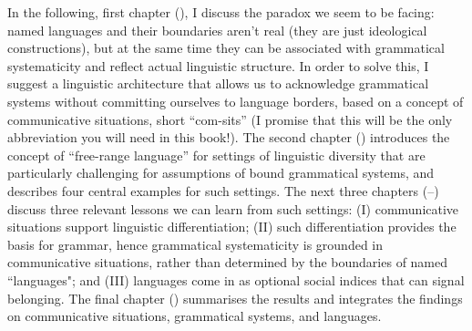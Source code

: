 In the following, first chapter (), I discuss the paradox we seem to be facing: named languages and their boundaries aren’t real (they are just ideological constructions), but at the same time they can be associated with grammatical systematicity and reflect actual linguistic structure. In order to solve this, I suggest a linguistic architecture that allows us to acknowledge grammatical systems without committing ourselves to language borders, based on a concept of communicative situations, short “com-sits” (I promise that this will be the only abbreviation you will need in this book!). The second chapter () introduces the concept of “free-range language” for settings of linguistic diversity that are particularly challenging for assumptions of bound grammatical systems, and describes four central examples for such settings. The next three chapters (--) discuss three relevant lessons we can learn from such settings:
(I) communicative situations support linguistic differentiation;
(II) such differentiation provides the basis for grammar, hence grammatical systematicity is grounded in communicative situations, rather than determined by the boundaries of named “languages"; and
(III) languages come in as optional social indices that can signal belonging. The final chapter () summarises the results and integrates the findings on communicative situations, grammatical systems, and languages.
